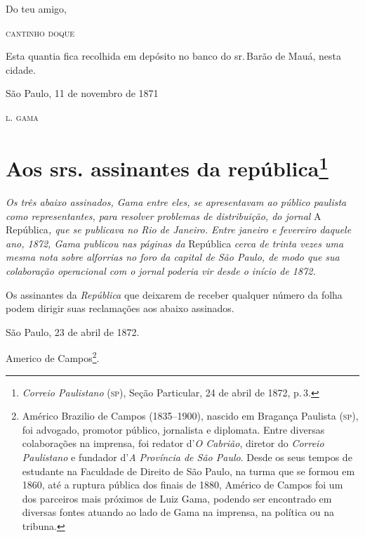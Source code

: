 \begin{flushright}
Do teu amigo,

\textsc{cantinho doque}
\end{flushright}

\asterisc

Esta quantia fica recolhida em depósito no banco do sr.\,Barão de Mauá,
nesta cidade.

\begin{flushright}
São Paulo, 11 de novembro de 1871

\textsc{l. gama}
\end{flushright}

\chapter{Aos srs. assinantes da república\footnote{\emph{Correio Paulistano} (\textsc{sp}), Seção Particular,
  24 de abril de 1872, p.\,3.}} %

\begin{didascalia}
\emph{Os três abaixo assinados, Gama entre eles, se apresentavam ao
público paulista como representantes, para resolver problemas de
distribuição, do jornal} A República\emph{, que se publicava no Rio de
Janeiro. Entre janeiro e fevereiro daquele ano, 1872, Gama publicou nas
páginas da} República \emph{cerca de trinta vezes uma mesma nota sobre
alforrias no foro da capital de São Paulo, de modo que sua colaboração
operacional com o jornal poderia vir desde o início de 1872.}
\end{didascalia}


Os assinantes da \emph{República} que deixarem de receber qualquer
número da folha podem dirigir suas reclamações aos abaixo assinados.

São Paulo, 23 de abril de 1872.

Americo de Campos\footnote{ Américo Brazilio de Campos (1835--1900),
  nascido em Bragança Paulista (\textsc{sp}), foi advogado, promotor público,
  jornalista e diplomata. Entre diversas colaborações na imprensa, foi
  redator d'\emph{O Cabrião}, diretor do \emph{Correio Paulistano} e
  fundador d'\emph{A Província de São Paulo}. Desde os seus tempos de
  estudante na Faculdade de Direito de São Paulo, na turma que se formou
  em 1860, até a ruptura pública dos finais de 1880, Américo de Campos
  foi um dos parceiros mais próximos de Luiz Gama, podendo ser
  encontrado em diversas fontes atuando ao lado de Gama na imprensa, na
  política ou na tribuna.}.

